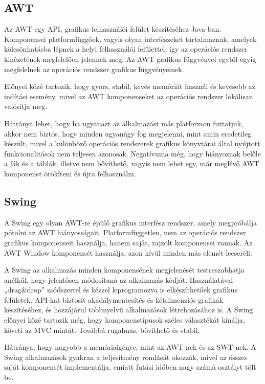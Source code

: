 \subsection*{AWT} 

Az AWT egy API, grafikus felhasználói felület készítéséhez Java-ban.
Komponensei platformfüggőek, vagyis olyan interfészeket tartalmaznak, amelyek kölcsönhatásba lépnek a helyi felhasználói felülettel, így az operációs rendszer kinézetének megfelelően jelennek meg.
Az AWT grafikus függvényei egytől egyig megfelelnek az operációs rendszer grafikus függvényeinek.

Előnyei közé tartozik, hogy gyors, stabil, kevés memóriát használ és kevesebb az indítási esemény, mivel az AWT komponenseket az operációs rendszer lokálisan valósítja meg.

Hátránya lehet, hogy ha ugyanazt az alkalmazást más platformon futtatjuk, akkor nem biztos, hogy minden ugyanúgy fog megjelenni, mint amin eredetileg készült, mivel a különböző operációs rendszerek grafikus könyvtárai által nyújtott funkcionalitások nem teljesen azonosak.
Negatívuma még, hogy hiányoznak belőle a fák és a táblák, illetve nem bővíthető, vagyis nem lehet egy, már meglévő AWT komponenst örökíteni és újra felhasználni.


\subsection*{Swing}

A Swing egy olyan AWT-re épülő grafikus interfész rendszer, amely megpróbálja pótolni az AWT hiányosságait.
Platformfüggetlen, nem az operációs rendszer grafikus komponenseit használja, hanem saját, rajzolt komponensei vannak.
Az AWT Window komponensét használja, azon kívül minden más elemét lecseréli.

A Swing az alkalmazás minden komponensének megjelenését testreszabhatja anélkül, hogy jelentősen módosítaná az alkalmazás kódját.
Használatával „drag\&drop”  módszerrel és kézzel leprogramozva is elkészíthetőek grafikus felületek.
API-kat biztosít akadálymentesítés és kétdimenziós grafikák készítéséhez, és hozzájárul többnyelvű alkalmazások létrehozásához is.
A Swing előnyei közé tartozik még, hogy komponenstípusok széles választékát kínálja, követi az MVC mintát.
Továbbá rugalmas, bővíthető és stabil.

Hátránya, hogy nagyobb a memóriaigénye, mint az AWT-nek és az SWT-nek.
A Swing alkalmazások gyakran a teljesítmény romlását okozzák, mivel az összes saját komponensét implementálja, emiatt futási időben nagy számú osztályt tölt be.


